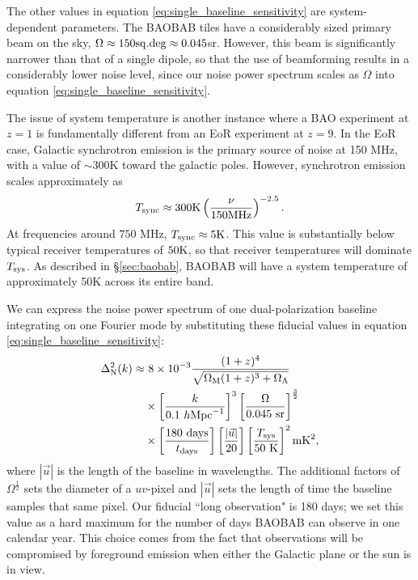 \documentclass[10pt,iop]{emulateapj}
\begin{document}
The other values in equation \ref{eq:single_baseline_sensitivity} are system-dependent parameters.
The BAOBAB tiles have a considerably sized primary beam on the sky, $\Omega \approx 150 \rm{sq. deg}\approx 0.045$sr.  However, this beam is significantly narrower than that of a single dipole,
so that the use of beamforming results in a considerably lower noise level,
since our noise power spectrum scales as $\Omega$ into equation \ref{eq:single_baseline_sensitivity}.

The issue of system temperature is another instance where a BAO experiment at $z=1$ is
fundamentally different from an EoR experiment at $z=9$.  In the EoR case, Galactic synchrotron emission is the primary source of noise at 150 MHz,
with a value of $\sim300$K toward the galactic poles.  However, synchrotron emission scales approximately as
\begin{equation}
    T_{\rm sync}\approx 300 {\rm K} \left(\frac{\nu}{150 {\rm MHz}}\right)^{-2.5}.
\end{equation}
At frequencies around $750$ MHz, $T_{\rm sync}\approx 5{\rm K}$.  This value is substantially below
typical receiver temperatures of $50{\rm K}$, so that receiver temperatures will dominate $T_{\rm sys}$.  As described
in \S\ref{sec:baobab}, BAOBAB will have a system temperature of approximately 50K across its
entire band.

We can express the noise power spectrum of one dual-polarization 
baseline integrating on one Fourier mode 
by substituting these fiducial values in equation \ref{eq:single_baseline_sensitivity}:
\begin{align}
\label{eq:quant_single_baseline_sensitivity}
    \Delta^2_{\rm N}(k) \approx &~8\times10^{-3} \frac{(1+z)^4}{\sqrt{\Omega_{\rm M}(1+z)^3+\Omega_\Lambda}}
    \nonumber\\&\times
    \left[\frac{k}{0.1\ h\rm{Mpc}^{-1}}\right]^3
    \left[\frac{\Omega}{0.045~\rm{sr}}\right]^\frac32
    \nonumber\\&\times
    \left[\frac{180~\rm{days}}{t_{\rm days}}\right]
    \left[\frac{|\vec{u}|}{20}\right]
    \left[\frac{T_{\rm sys}}{50~\rm{K}}\right]^2 \rm{mK}^2,
\end{align}
where $|\vec{u}|$ is the length of the baseline in wavelengths.
The additional factors of $\Omega^\frac12$ sets the diameter of a $uv$-pixel
and $|\vec{u}|$ sets the length of time the baseline samples that same pixel.  Our fiducial
``long observation" is 180 days; we set this value as a hard maximum for the number
of days BAOBAB can observe in one calendar year.  This choice comes from the fact that observations
will be compromised by foreground emission when either the Galactic plane or the sun is in view.
\end{document}
